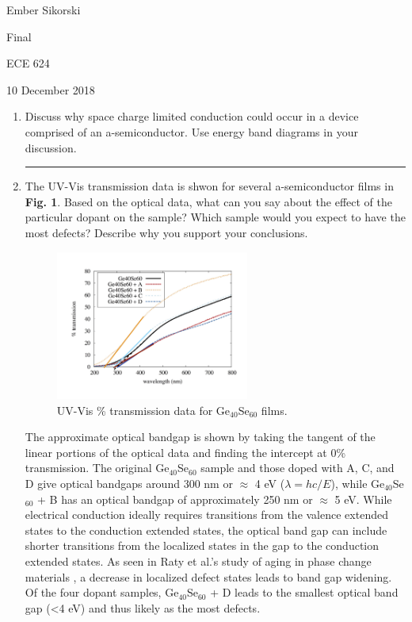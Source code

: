 \documentclass[12pt]{elsarticle}
\newcommand{\fullline}{\noindent\rule{14cm}{0.4pt} \vspace{4mm}}
\begin{document}
\begin{flushright}
	Ember Sikorski\par
	Final\par
	ECE 624\par 
	10 December 2018
\end{flushright}


\begin{enumerate}
\item Discuss why space charge limited conduction could occur in a device comprised of an
a-semiconductor. Use energy band diagrams in your discussion. 
\par 
\fullline

\item The UV-Vis transmission data is shwon for several a-semiconductor films in \textbf{Fig. 1}. Based on the optical data, what can you say about the effect of the particular dopant on the sample? Which sample would you expect to have the most defects? Describe why you support your conclusions.

\begin{figure}[H]
	\centering
	\includegraphics[width=0.6\textwidth]{fig1}
	\caption{UV-Vis \% transmission data for Ge$_{40}$Se$_{60}$ films.}
\end{figure}
\par 

The approximate optical bandgap is shown by taking the tangent of the linear portions of the optical data and finding the intercept at 0\% transmission. The original Ge$_{40}$Se$_{60}$ sample and those doped with A, C, and D give optical bandgaps around 300 nm or $\approx$ 4 eV ($\lambda=hc/E$), while Ge$_{40}$Se$_{60}$ + B has an optical bandgap of approximately 250 nm or $\approx$ 5 eV. While electrical conduction ideally requires transitions from the valence extended states to the conduction extended states, the optical band gap can include shorter transitions from the localized states in the gap to the conduction extended states. As seen in Raty et al.'s study of aging in phase change materials \cite{Raty2015}, a decrease in localized defect states leads to band gap widening. Of the four dopant samples, Ge$_{40}$Se$_{60}$ + D leads to the smallest optical band gap (<4 eV) and thus likely as the most defects.


\end{enumerate}
\end{document}
